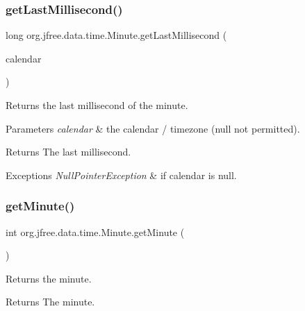 \subsubsection{\texorpdfstring{get\+Last\+Millisecond()}{getLastMillisecond()}\hspace{0.1cm}{\footnotesize\ttfamily [2/2]}}
{\footnotesize\ttfamily long org.\+jfree.\+data.\+time.\+Minute.\+get\+Last\+Millisecond (\begin{DoxyParamCaption}\item[{Calendar}]{calendar }\end{DoxyParamCaption})}

Returns the last millisecond of the minute.


\begin{DoxyParams}{Parameters}
{\em calendar} & the calendar / timezone ({\ttfamily null} not permitted).\\
\hline
\end{DoxyParams}
\begin{DoxyReturn}{Returns}
The last millisecond.
\end{DoxyReturn}

\begin{DoxyExceptions}{Exceptions}
{\em Null\+Pointer\+Exception} & if {\ttfamily calendar} is {\ttfamily null}. \\
\hline
\end{DoxyExceptions}
\mbox{\label{classorg_1_1jfree_1_1data_1_1time_1_1_minute_a01e4266b1b77c7b296786bd15975d4b2}} 
\subsubsection{\texorpdfstring{get\+Minute()}{getMinute()}}
{\footnotesize\ttfamily int org.\+jfree.\+data.\+time.\+Minute.\+get\+Minute (\begin{DoxyParamCaption}{ }\end{DoxyParamCaption})}

Returns the minute.

\begin{DoxyReturn}{Returns}
The minute. 
\end{DoxyReturn}
\mbox{\label{classorg_1_1jfree_1_1data_1_1time_1_1_minute_ae8cff727e9675fca26364ceccefe57b7}} 

